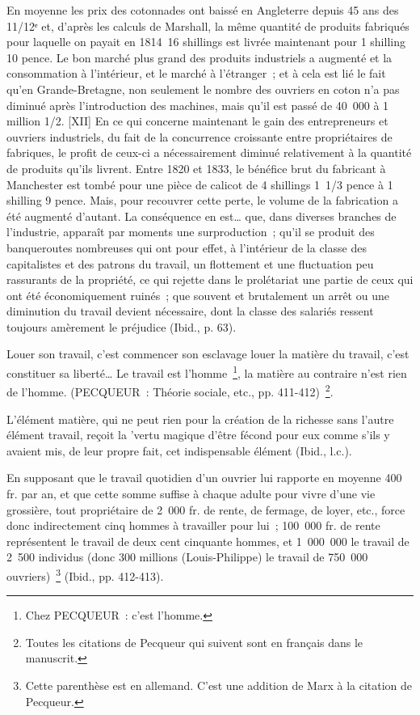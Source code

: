 \documentclass[french,twoside]{book} %
\newenvironment{quoteblock}%
  {\begin{quoting}}
  {\end{quoting}}
\newenvironment{quotebar}{%
    \def\FrameCommand{{\color{rubric!10!}\vrule width 0.5em} \hspace{0.9em}}%
    \def\OuterFrameSep{\itemsep} %
    \MakeFramed {\advance\hsize-\width \FrameRestore}
  }%
  {%
    \endMakeFramed
  }
\renewenvironment{quoteblock}%
  {%
    \savenotes
    \setstretch{0.9}
    \normalfont
    \begin{quotebar}
  }
  {%
    \end{quotebar}
    \spewnotes
  }
\begin{document}
\begin{quoteblock}
 En moyenne les prix des cotonnades ont baissé en Angleterre depuis 45 ans des 11/12ᵉ et, d’après les calculs de Marshall, la même quantité de produits fabriqués pour laquelle on payait en 1814 16 shillings est livrée maintenant pour 1 shilling 10 pence. Le bon marché plus grand des produits industriels a augmenté et la consommation à l’intérieur, et le marché à l’étranger ; et à cela est lié le fait qu’en Grande-Bretagne, non seulement le nombre des ouvriers en coton n’a pas diminué après l’introduction des machines, mais qu’il est passé de 40 000 à 1 million 1/2. [XII] En ce qui concerne maintenant le gain des entrepreneurs et ouvriers industriels, du fait de la concurrence croissante entre propriétaires de fabriques, le profit de ceux-ci a nécessairement diminué relativement à la quantité de produits qu’ils livrent. Entre 1820 et 1833, le bénéfice brut du fabricant à Manchester est tombé pour une pièce de calicot de 4 shillings 1 1/3 pence à 1 shilling 9 pence. Mais, pour recouvrer cette perte, le volume de la fabrication a été augmenté d’autant. La conséquence en est… que, dans diverses branches de l’industrie, apparaît par moments une surproduction ; qu’il se produit des banqueroutes nombreuses qui ont pour effet, à l’intérieur de la classe des capitalistes et des patrons du travail, un flottement et une fluctuation peu rassurants de la propriété, ce qui rejette dans le prolétariat une partie de ceux qui ont été économiquement ruinés ; que souvent et brutalement un arrêt ou une diminution du travail devient nécessaire, dont la classe des salariés ressent toujours amèrement le préjudice (Ibid., p. 63).\par
 Louer son travail, c’est commencer son esclavage louer la matière du travail, c’est constituer sa liberté… Le travail est l’homme \footnote{Chez PECQUEUR : c’est l’homme.}, la matière au contraire n’est rien de l’homme. (PECQUEUR : Théorie sociale, etc., pp. 411-412) \footnote{Toutes les citations de Pecqueur qui suivent sont en français dans le manuscrit.}.\par
 L’élément matière, qui ne peut rien pour la création de la richesse sans l’autre élément travail, reçoit la 'vertu magique d’être fécond pour eux comme s’ils y avaient mis, de leur propre fait, cet indispensable élément (Ibid., l.c.).\par
 En supposant que le travail quotidien d’un ouvrier lui rapporte en moyenne 400 fr. par an, et que cette somme suffise à chaque adulte pour vivre d’une vie grossière, tout propriétaire de 2 000 fr. de rente, de fermage, de loyer, etc., force donc indirectement cinq hommes à travailler pour lui ; 100 000 fr. de rente représentent le travail de deux cent cinquante hommes, et 1 000 000 le travail de 2 500 individus (donc 300 millions (Louis-Philippe) le travail de 750 000 ouvriers) \footnote{Cette parenthèse est en allemand. C’est une addition de Marx à la citation de Pecqueur.} (Ibid., pp. 412-413).\par

\end{quoteblock}
\end{document}
